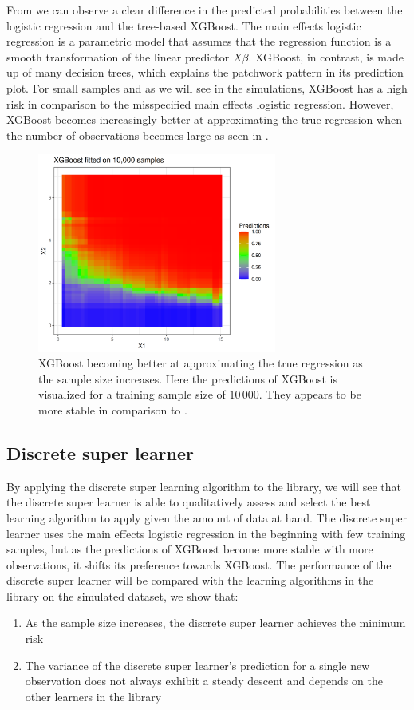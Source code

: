 \documentclass[./main.tex]{subfiles}
\begin{document}
From  we can observe a clear difference in the predicted probabilities between the logistic regression and the tree-based XGBoost. The main effects logistic regression is a parametric model that assumes that the regression function is a smooth transformation of the linear predictor $ X\beta $. XGBoost, in contrast, is made up of many decision trees, which explains the patchwork pattern in its prediction plot. For small samples and as we will see in the simulations, XGBoost has a high risk in comparison to the misspecified main effects logistic regression. However, XGBoost becomes increasingly better at approximating the true regression when the number of observations becomes large as seen in . 
\begin{figure}[H]
    \centering
    \includegraphics[width=0.7\textwidth]{figures/xgboost10k.png}
    \caption{XGBoost becoming better at approximating the true regression as the sample size increases. Here the predictions of XGBoost is visualized for a training sample size of $ 10\,000 $. They appears to be more stable in comparison to .}
    \label{fig:xgboost10k}
\end{figure}
\subsection{Discrete super learner}
By applying the discrete super learning algorithm to the library, we will see that the discrete super learner is able to qualitatively assess and select the best learning algorithm to apply given the amount of data at hand. The discrete super learner uses the main effects logistic regression in the beginning with few training samples, but as the predictions of XGBoost become more stable with more observations, it shifts its preference towards XGBoost. The performance of the discrete super learner will be compared with the learning algorithms in the library on the simulated dataset, we show that:
\begin{enumerate}
    \item As the sample size increases, the discrete super learner achieves the minimum risk 
    \item The variance of the discrete super learner's prediction for a single new observation does not always exhibit a steady descent and depends on the other learners in the library
\end{enumerate}
\end{document}
